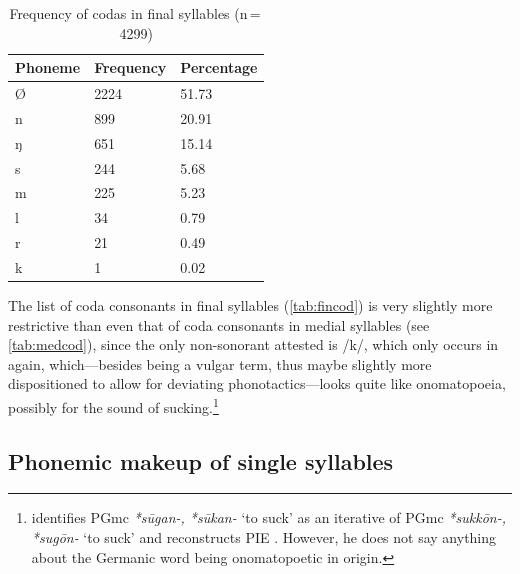 \begin{table}[pt]\centering
\caption[Frequency of codas in final syllables]{Frequency of codas in final 
syllables (n\,=\,4299)}
\begin{tabu} to 0.67\linewidth{X X[c] X[c]}
\tableheaderfont\toprule
Phoneme
	& Frequency
	& Percentage
	\\
	
\toprule

Ø
	& 2224
	& 51.73\pct
	\\

\midrule

n
	& 899
	& 20.91\pct
	\\

ŋ
	& 651
	& 15.14\pct
	\\

s
	& 244
	& 5.68\pct
	\\

m
	& 225
	& 5.23\pct
	\\

l
	& 34
	& 0.79\pct
	\\

r
	& 21
	& 0.49\pct
	\\

k
	& 1
	& 0.02\pct
	\\

\bottomrule
\end{tabu}
\label{tab:fincod}
\end{table}

The list of coda consonants in final syllables (\autoref{tab:fincod}) is very 
slightly more restrictive than even that of coda consonants in medial syllables
(see \autoref{tab:medcod}), since the only non-sonorant attested is /k/, which 
only occurs in  again, which---besides being a 
vulgar term, thus maybe slightly more dispositioned to allow for deviating 
phonotactics---looks quite like onomatopoeia, possibly for the sound of 
sucking.\footnote{\citet[489--490]{kroonen2013} identifies PGmc \textit{*sūgan-,
*sūkan-} `to suck' as an iterative of PGmc \textit{*sukkōn-, *sugōn-} `to suck' 
and reconstructs PIE . However, he does not say 
anything about the Germanic word being onomatopoetic in origin.}
%

\subsection{Phonemic makeup of single syllables}

